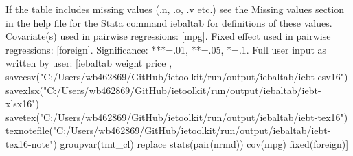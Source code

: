 If the table includes missing values (.n, .o, .v etc.) see the Missing values section in the help file for the Stata command iebaltab for definitions of these values. Covariate(s) used in pairwise regressions: [mpg]. Fixed effect used in pairwise regressions: [foreign]. Significance: ***=.01, **=.05, *=.1. Full user input as written by user: [iebaltab weight price , savecsv("C:/Users/wb462869/GitHub/ietoolkit/run/output/iebaltab/iebt-csv16") savexlsx("C:/Users/wb462869/GitHub/ietoolkit/run/output/iebaltab/iebt-xlsx16") savetex("C:/Users/wb462869/GitHub/ietoolkit/run/output/iebaltab/iebt-tex16") texnotefile("C:/Users/wb462869/GitHub/ietoolkit/run/output/iebaltab/iebt-tex16-note") groupvar(tmt\_cl) replace stats(pair(nrmd)) cov(mpg) fixed(foreign)]
